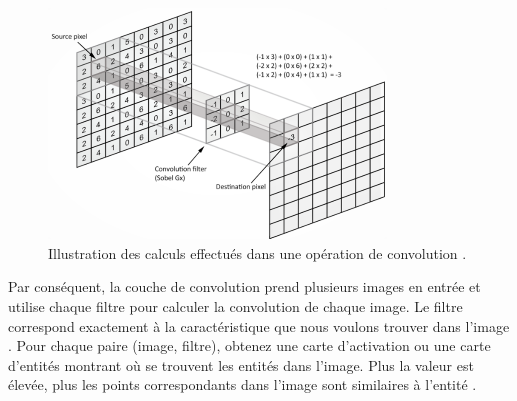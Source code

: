 	\begin{figure}[H]%
		\centering
		\includegraphics[width=0.8\textwidth]{images/cnn_kernel_filter}
		\caption[Illustration des calculs effectués dans une opération de convolution.]{Illustration des calculs effectués dans une opération de convolution \cite{antoine2018apprentissage}.}
		\label{fig:cnn_kernel_filter}
	\end{figure}
	
	
	
	
	Par conséquent, la couche de convolution prend plusieurs images en entrée  et utilise chaque filtre pour calculer la convolution de  chaque image. Le filtre correspond exactement à la caractéristique que nous voulons trouver dans l'image \cite{shin2016deep}. 
	Pour chaque paire (image, filtre), obtenez une carte d'activation ou une carte d'entités montrant où se trouvent les entités dans l'image. Plus la valeur est élevée, plus les points correspondants dans l'image sont similaires à l'entité \cite{goodfellow2016deep}.
	
